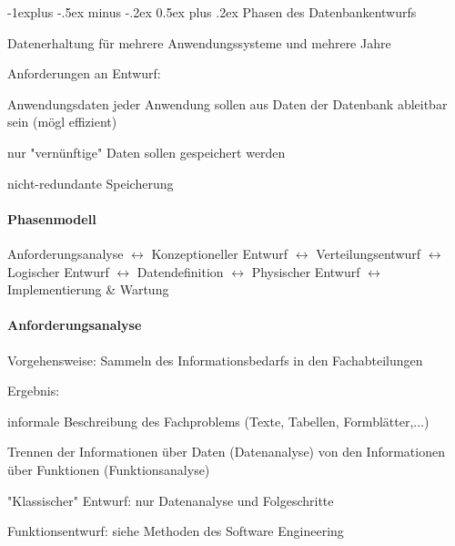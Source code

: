 \documentclass[a4paper]{article}
\makeatletter
\renewcommand{\subsection}{\@startsection{subsection}{2}{0mm}%
                                {-1explus -.5ex minus -.2ex}%
                                {0.5ex plus .2ex}%
                                {\normalfont\normalsize\bfseries}}
\makeatother
\begin{document}
\begin{multicols}{3}
\subsection{Phasen des Datenbankentwurfs}
\begin{itemize*}
    \item Datenerhaltung für mehrere Anwendungssysteme und mehrere Jahre
    \item Anforderungen an Entwurf:
    \begin{itemize*}
        \item Anwendungsdaten jeder Anwendung sollen aus Daten der Datenbank ableitbar sein (mögl effizient)
        \item nur "vernünftige" Daten sollen gespeichert werden
        \item nicht-redundante Speicherung
    \end{itemize*}
\end{itemize*}

\paragraph{Phasenmodell}
Anforderungsanalyse $\leftrightarrow$ Konzeptioneller Entwurf  $\leftrightarrow$ Verteilungsentwurf $\leftrightarrow$ Logischer Entwurf $\leftrightarrow$ Datendefinition $\leftrightarrow$ Physischer Entwurf $\leftrightarrow$ Implementierung \& Wartung

\paragraph{Anforderungsanalyse}
\begin{itemize*}
    \item Vorgehensweise: Sammeln des Informationsbedarfs in den Fachabteilungen
    \item Ergebnis:
    \begin{itemize*}
        \item informale Beschreibung des Fachproblems (Texte, Tabellen, Formblätter,...)
        \item Trennen der Informationen über Daten (Datenanalyse) von den Informationen über Funktionen (Funktionsanalyse)
    \end{itemize*}
    \item "Klassischer" Entwurf: nur Datenanalyse und Folgeschritte
    \item Funktionsentwurf: siehe Methoden des Software Engineering
\end{itemize*}


\end{multicols}
\end{document}
